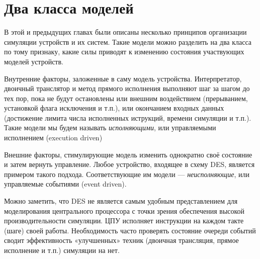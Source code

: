 

\section[Два класса моделей]{Два класса моделей}

В этой и предыдущих главах были описаны несколько принципов организации симуляции устройств и их систем. Такие модели можно разделить на два класса по тому признаку, какие силы приводят к изменению состояния участвующих моделей устройств.

\begin{enumerate*}
    \item Внутренние факторы, заложенные в саму модель устройства. Интерпретатор, двоичный транслятор и метод прямого исполнения выполняют шаг за шагом до тех пор, пока не будут остановлены или внешним воздействием (прерыванием, установкой флага исключения и т.п.), или окончанием входных данных (достижение лимита числа исполненных иструкций, времени симуляции и т.п.). Такие модели мы будем называть \textit{исполняющими}, или управляемыми исполнением (\abbr execution driven)
    \item Внешние факторы, стимулирующие модель изменить однократно своё состояние и затем вернуть управление. Любое устройство, входящее в схему DES, является примером такого подхода. Соответствующие им модели — \textit{неисполняющие}, или управляемые событиями (\abbr event driven).
\end{enumerate*}

Можно заметить, что DES не является самым удобным представлением для моделирования центрального процессора с точки зрения обеспечения высокой производительности симуляции. ЦПУ исполняет инструкции на каждом такте (шаге) своей работы. Необходимость часто проверять состояние очереди событий сводит эффективность «улучшенных» техник (двоичная трансляция, прямое исполнение и т.п.) симуляции на нет. 

